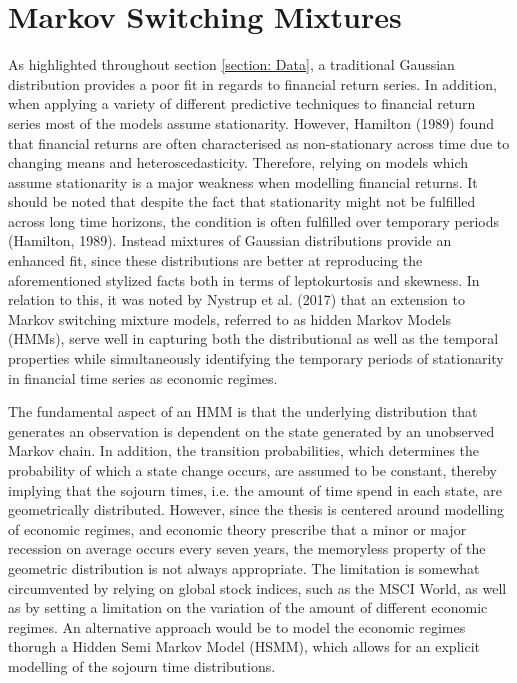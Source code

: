 \newpage
 \section{Markov Switching Mixtures}
As highlighted throughout section \ref{section: Data}, a traditional Gaussian distribution provides a poor fit in regards to financial return series. In addition, when applying a variety of different predictive techniques to financial return series most of the models assume stationarity. However, Hamilton (1989) found that financial returns are often characterised as non-stationary across time due to changing means and heteroscedasticity. Therefore, relying on models which assume stationarity is a major weakness when modelling financial returns. It should be noted that despite the fact that stationarity might not be fulfilled across long time horizons, the condition is often fulfilled over temporary periods (Hamilton, 1989). Instead mixtures of Gaussian distributions provide an enhanced fit, since these distributions are better at reproducing the aforementioned stylized facts both in terms of leptokurtosis and skewness. In relation to this, it was noted by Nystrup et al. (2017) that an extension to Markov switching mixture models, referred to as hidden Markov Models (HMMs), serve well in capturing both the distributional as well as the temporal properties while simultaneously identifying the temporary periods of stationarity in financial time series as economic regimes. 

The fundamental aspect of an HMM is that the underlying distribution that generates an observation is dependent on the state generated by an unobserved Markov chain. In addition, the transition probabilities, which determines the probability of which a state change occurs, are assumed to be constant, thereby implying that the sojourn times, i.e. the amount of time spend in each state, are geometrically distributed. However, since the thesis is centered around modelling of economic regimes, and economic theory prescribe that a minor or major recession on average occurs every seven years, the memoryless property of the geometric distribution is not always appropriate. The limitation is somewhat circumvented by relying on global stock indices, such as the MSCI World, as well as by setting a limitation on the variation of the amount of different economic regimes. An alternative approach would be to model the economic regimes thorugh a Hidden Semi Markov Model (HSMM), which allows for an explicit modelling of the sojourn time distributions. 

